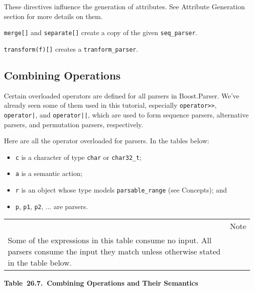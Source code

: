 These directives influence the generation of attributes. See Attribute Generation section for more details on them.

\texttt{merge{[}{]}} and \texttt{separate{[}{]}} create a copy of the given \texttt{seq\_parser}.

\texttt{transform(f){[}{]}} creates a \texttt{tranform\_parser}.

\subsection{Combining Operations}

Certain overloaded operators are defined for all parsers in Boost.Parser. We've already seen some of them used in this tutorial, especially \texttt{operator>>}, \texttt{operator|}, and \texttt{operator||}, which are used to form sequence parsers, alternative parsers, and permutation parsers, respectively.

Here are all the operator overloaded for parsers. In the tables below:

\begin{itemize}
\item
  \texttt{c} is a character of type \texttt{char} or \texttt{char32\_t};
\item
  \texttt{a} is a semantic action;
\item
  \texttt{r} is an object whose type models \texttt{parsable\_range} (see Concepts); and
\item
  \texttt{p}, \texttt{p1}, \texttt{p2}, ... are parsers.
\end{itemize}

\begin{longtable}[]{@{}
  >{\raggedright\arraybackslash}p{}
  >{\raggedright\arraybackslash}p{}@{}}
\toprule\noalign{}
\endhead
\bottomrule\noalign{}
\endlastfoot
\begin{minipage}[t]{\linewidth}\raggedright
\end{minipage} & Note \\
Some of the expressions in this table consume no input. All parsers consume the input they match unless otherwise stated in the table below. & \\
\end{longtable}

\textbf{Table~26.7.~Combining Operations and Their Semantics}


